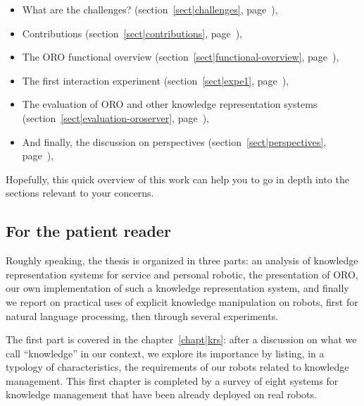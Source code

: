 \begin{itemize} \item What are the challenges? (section~\ref{sect|challenges},
            page~\pageref{sect|challenges}),

    \item Contributions (section~\ref{sect|contributions},
        page~\pageref{sect|contributions}),

    \item The ORO functional overview (section~\ref{sect|functional-overview},
        page~\pageref{sect|functional-overview}),

    \item The first interaction experiment (section~\ref{sect|expe1},
        page~\pageref{sect|expe1}),

    \item The evaluation of ORO and other knowledge representation systems
        (section~\ref{sect|evaluation-oroserver},
        page~\pageref{sect|evaluation-oroserver}),

    \item And finally, the discussion on perspectives
        (section~\ref{sect|perspectives}, page~\pageref{sect|perspectives}),

\end{itemize}

Hopefully, this quick overview of this work can help you to go in depth into
the sections relevant to your concerns.


\subsection*{For the patient reader}

Roughly speaking, the thesis is organized in three parts: an analysis of
knowledge representation systems for service and personal robotic, the
presentation of ORO, our own implementation of such a knowledge representation
system, and finally we report on practical uses of explicit knowledge
manipulation on robots, first for natural language processing, then through
several experiments.

The first part is covered in the chapter~\ref{chapt|krs}: after a discussion on
what we call ``knowledge'' in our context, we explore its importance by
listing, in a typology of characteristics, the requirements of our robots
related to knowledge management. This first chapter is completed by a survey of
eight systems for knowledge management that have been already deployed on real
robots.

